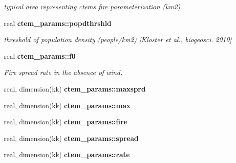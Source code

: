 \begin{DoxyCompactItemize}
\begin{DoxyCompactList}\small\item\em typical area representing ctem\textquotesingle{}s fire parameterization (km2) \end{DoxyCompactList}\item 
\hypertarget{namespacectem__params_a0a275d244526015c0b2ea9dc397c2256}{}real {\bfseries ctem\+\_\+params\+::popdthrshld}\label{namespacectem__params_a0a275d244526015c0b2ea9dc397c2256}

\begin{DoxyCompactList}\small\item\em threshold of population density (people/km2) \mbox{[}Kloster et al., biogeosci. 2010\mbox{]} \end{DoxyCompactList}\item 
\hypertarget{namespacectem__params_af0e5f58c072516e8d0d757f843161bc5}{}real {\bfseries ctem\+\_\+params\+::f0}\label{namespacectem__params_af0e5f58c072516e8d0d757f843161bc5}

\begin{DoxyCompactList}\small\item\em Fire spread rate in the absence of wind. \end{DoxyCompactList}\item 
\hypertarget{namespacectem__params_a9eac43cb4ce26be279a87b758a8dece2}{}real, dimension(kk) {\bfseries ctem\+\_\+params\+::maxsprd}\label{namespacectem__params_a9eac43cb4ce26be279a87b758a8dece2}

\item 
\hypertarget{namespacectem__params_adae5b81b063ac046ac5a3096d6ccf1c6}{}real, dimension(kk) {\bfseries ctem\+\_\+params\+::max}\label{namespacectem__params_adae5b81b063ac046ac5a3096d6ccf1c6}

\item 
\hypertarget{namespacectem__params_a90daa59f2a8b60fdf68798e96cb96551}{}real, dimension(kk) {\bfseries ctem\+\_\+params\+::fire}\label{namespacectem__params_a90daa59f2a8b60fdf68798e96cb96551}

\item 
\hypertarget{namespacectem__params_a3eb9bb2e4f3ebfc8af1413f5e4b3f927}{}real, dimension(kk) {\bfseries ctem\+\_\+params\+::spread}\label{namespacectem__params_a3eb9bb2e4f3ebfc8af1413f5e4b3f927}

\item 
\hypertarget{namespacectem__params_a3a8a6a0bc933317deaeecb2d4b0e52c7}{}real, dimension(kk) {\bfseries ctem\+\_\+params\+::rate}\label{namespacectem__params_a3a8a6a0bc933317deaeecb2d4b0e52c7}


\end{DoxyCompactItemize}
